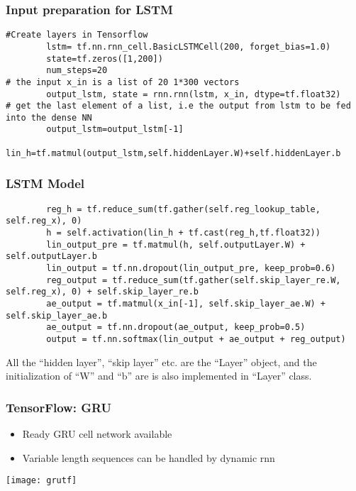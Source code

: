 \begin{frame}[fragile] \frametitle{Input preparation for LSTM}
\begin{lstlisting}
#Create layers in Tensorflow
        lstm= tf.nn.rnn_cell.BasicLSTMCell(200, forget_bias=1.0)
        state=tf.zeros([1,200])
        num_steps=20
# the input x_in is a list of 20 1*300 vectors
        output_lstm, state = rnn.rnn(lstm, x_in, dtype=tf.float32)
# get the last element of a list, i.e the output from lstm to be fed into the dense NN
        output_lstm=output_lstm[-1]
        lin_h=tf.matmul(output_lstm,self.hiddenLayer.W)+self.hiddenLayer.b
\end{lstlisting}
\end{frame}


\begin{frame}[fragile] \frametitle{LSTM Model}
\begin{lstlisting}
        reg_h = tf.reduce_sum(tf.gather(self.reg_lookup_table, self.reg_x), 0)
        h = self.activation(lin_h + tf.cast(reg_h,tf.float32))
        lin_output_pre = tf.matmul(h, self.outputLayer.W) + self.outputLayer.b
        lin_output = tf.nn.dropout(lin_output_pre, keep_prob=0.6)
        reg_output = tf.reduce_sum(tf.gather(self.skip_layer_re.W, self.reg_x), 0) + self.skip_layer_re.b
        ae_output = tf.matmul(x_in[-1], self.skip_layer_ae.W) + self.skip_layer_ae.b 
        ae_output = tf.nn.dropout(ae_output, keep_prob=0.5)
        output = tf.nn.softmax(lin_output + ae_output + reg_output)
\end{lstlisting}

All the ``hidden layer'', ``skip layer'' etc. are the ``Layer'' object, and the initialization of ``W'' and ``b'' are is also implemented in ``Layer'' class.
\end{frame}


\begin{frame}[fragile] \frametitle{TensorFlow: GRU}
\begin{itemize}
\item Ready GRU cell network available
\item Variable length sequences can be handled by dynamic rnn
\end{itemize}
\begin{center}
\texttt{[image: grutf]}
\end{center}
\end{frame}


